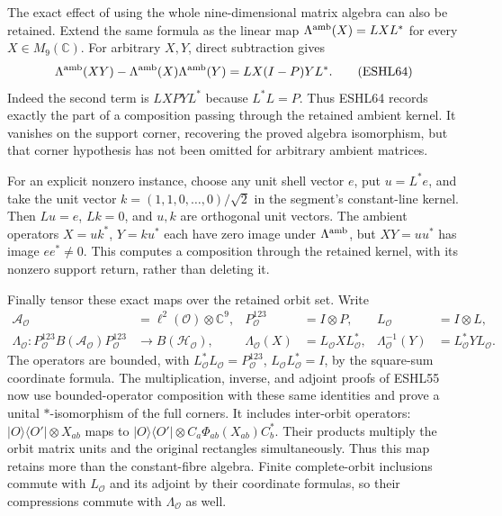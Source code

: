 \documentclass[
  10pt,
  a4paper,
]{article}
\begin{document}
The exact effect of using the whole nine-dimensional matrix algebra can
also be retained. Extend the same formula as the linear map
\(\Lambda^{\rm amb}(X)=LXL^*\) for every \(X\in M_9(\mathbb C)\). For
arbitrary \(X,Y\), direct subtraction gives \[
\Lambda^{\rm amb}(XY)-\Lambda^{\rm amb}(X)\Lambda^{\rm amb}(Y)
=LX(I-P)YL^*.
\tag{ESHL64}
\] Indeed the second term is \(LXPYL^*\) because \(L^*L=P\). Thus ESHL64
records exactly the part of a composition passing through the retained
ambient kernel. It vanishes on the support corner, recovering the proved
algebra isomorphism, but that corner hypothesis has not been omitted for
arbitrary ambient matrices.

For an explicit nonzero instance, choose any unit shell vector \(e\),
put \(u=L^*e\), and take the unit vector \(k=(1,1,0,\ldots,0)/\sqrt2\)
in the segment's constant-line kernel. Then \(Lu=e\), \(Lk=0\), and
\(u,k\) are orthogonal unit vectors. The ambient operators \(X=uk^*\),
\(Y=ku^*\) each have zero image under \(\Lambda^{\rm amb}\), but
\(XY=uu^*\) has image \(ee^*\ne0\). This computes a composition through
the retained kernel, with its nonzero support return, rather than
deleting it.

Finally tensor these exact maps over the retained orbit set. Write \[
\begin{aligned}
\mathcal A_{\mathcal O}&=\ell^2(\mathcal O)\otimes\mathbb C^9,
&P_{\mathcal O}^{123}&=I\otimes P,
&L_{\mathcal O}&=I\otimes L,\\
\Lambda_{\mathcal O}:P_{\mathcal O}^{123}B(\mathcal A_{\mathcal O})P_{\mathcal O}^{123}
&\longrightarrow B(\mathcal H_{\mathcal O}),
&\Lambda_{\mathcal O}(X)&=L_{\mathcal O}XL_{\mathcal O}^*,
&\Lambda_{\mathcal O}^{-1}(Y)&=L_{\mathcal O}^*YL_{\mathcal O}.
\end{aligned}
\tag{ESHL62}
\] The operators are bounded, with
\(L_{\mathcal O}^*L_{\mathcal O}=P_{\mathcal O}^{123}\),
\(L_{\mathcal O}L_{\mathcal O}^*=I\), by the square-sum coordinate
formula. The multiplication, inverse, and adjoint proofs of ESHL55 now
use bounded-operator composition with these same identities and prove a
unital \(*\)-isomorphism of the full corners. It includes inter-orbit
operators: \(|O\rangle\langle O'|\otimes X_{ab}\) maps to
\(|O\rangle\langle O'|\otimes C_a\Phi_{ab}(X_{ab})C_b^*\). Their
products multiply the orbit matrix units and the original rectangles
simultaneously. Thus this map retains more than the constant-fibre
algebra. Finite complete-orbit inclusions commute with
\(L_{\mathcal O}\) and its adjoint by their coordinate formulas, so
their compressions commute with \(\Lambda_{\mathcal O}\) as well.
\end{document}
